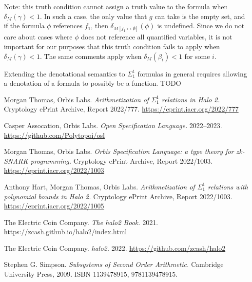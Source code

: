 \documentclass[11pt]{article}
\begin{document}
\begin{enumerate}
		Note: this truth condition cannot assign a truth value to the formula when $\delta_M(\gamma) < 1$.
		In such a case, the only value that $g$ can take is the empty set, and
		if the formula $\phi$ references $f_1$, then $\delta_{M[f_1 \mapsto \emptyset]}(\phi)$
		is undefined. Since we do not care about cases where $\phi$ does not reference
		all quantified variables, it is not important for our purposes that this
		truth condition fails to apply when $\delta_M(\gamma) < 1$. The same comments
		apply when $\delta_M(\beta_i) < 1$ for some $i$.
\end{enumerate}

Extending the denotational semantics to $\Sigma^1_1$ formulas in general requires allowing a denotation of a formula to possibly be a function. TODO


\clearpage

\begin{thebibliography}{6}
	
	 Morgan Thomas, Orbis Labs. \textit{Arithmetization of $\Sigma^1_1$ relations in Halo 2.} Cryptology ePrint Archive, Report 2022/777. \url{https://eprint.iacr.org/2022/777}

	 Casper Assocation, Orbis Labs. \textit{Open Specification Language.} 2022--2023. \url{https://github.com/Polytopoi/osl}

	 Morgan Thomas, Orbis Labs. \textit{Orbis Specification Language: a type theory for zk-SNARK programming.} Cryptology ePrint Archive, Report 2022/1003. \url{https://eprint.iacr.org/2022/1003}

	 Anthony Hart, Morgan Thomas, Orbis Labs. \textit{Arithmetization of $\Sigma^1_1$ relations with polynomial bounds in Halo 2.} Cryptology ePrint Archive, Report 2022/1003. \url{https://eprint.iacr.org/2022/1005}

	 The Electric Coin Company. \textit{The halo2 Book.} 2021. \url{https://zcash.github.io/halo2/index.html}

	 The Electric Coin Company. \textit{halo2.} 2022. \url{https://github.com/zcash/halo2}

	 Stephen G. Simpson. \textit{Subsystems of Second Order Arithmetic.} Cambridge University Press, 2009. ISBN 1139478915, 9781139478915.


\end{thebibliography}
\end{document}
